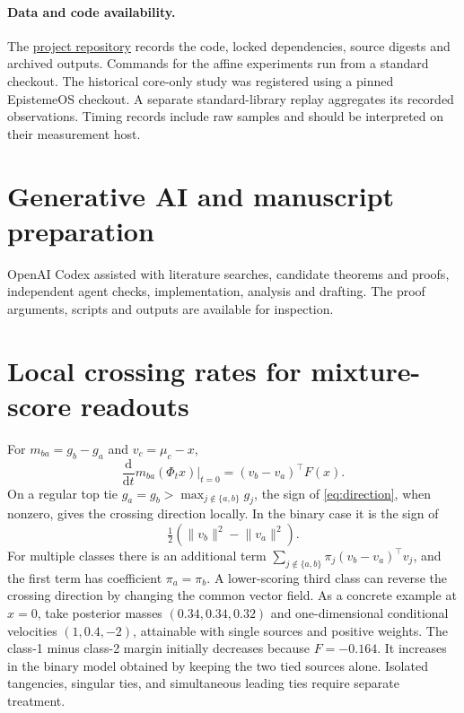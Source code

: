 \documentclass[10pt]{article}
\newcommand{\dd}{\mathrm{d}}
\newcommand{\norm}[1]{\lVert #1\rVert}
\begin{document}
\paragraph{Data and code availability.}
The \href{https://github.com/AdamCage/gravitational-decision-maps}{project
repository} records the code, locked dependencies, source digests and
archived outputs. Commands for the affine experiments run from a
standard checkout. The historical core-only study was registered using
a pinned EpistemeOS checkout. A separate standard-library replay
aggregates its recorded observations. Timing records include raw
samples and should be interpreted on their measurement host.

\section*{Generative AI and manuscript preparation}
OpenAI Codex assisted with literature searches, candidate theorems
and proofs, independent agent checks, implementation, analysis and
drafting. The proof arguments, scripts and outputs are available for
inspection.

\ifdefined\ArticleOnly\else
\appendix



\section{Local crossing rates for mixture-score readouts}
For $m_{ba}=g_b-g_a$ and $v_c=\mu_c-x$,
\begin{equation}
 \frac{\dd}{\dd t}m_{ba}(\Phi_t x)\bigg|_{t=0}=(v_b-v_a)^\top F(x).
 \label{eq:direction}
\end{equation}
On a regular top tie $g_a=g_b>\max_{j\notin\{a,b\}}g_j$, the sign of \eqref{eq:direction}, when nonzero, gives the crossing direction locally. In the binary case it is the sign of
\[
 \tfrac12(\norm{v_b}^2-\norm{v_a}^2).
\]
For multiple classes there is an additional term $\sum_{j\notin\{a,b\}}\pi_j(v_b-v_a)^\top v_j$, and the first term has coefficient $\pi_a=\pi_b$. A lower-scoring third class can reverse the crossing direction by changing the common vector field. As a concrete example at $x=0$, take posterior masses $(0.34,0.34,0.32)$ and one-dimensional conditional velocities $(1,0.4,-2)$, attainable with single sources and positive weights. The class-1 minus class-2 margin initially decreases because $F=-0.164$. It increases in the binary model obtained by keeping the two tied sources alone. Isolated tangencies, singular ties, and simultaneous leading ties require separate treatment.
\end{document}
